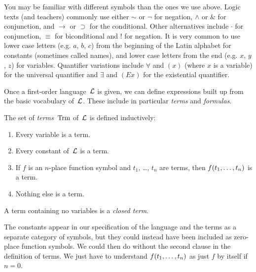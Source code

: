 \documentclass[open-logic-section]{subfiles}
\begin{document}

\begin{intro}
You may be familiar with different symbols than the ones we use
above. Logic texts (and teachers) commonly use either $\sim$ or $\neg$
for negation, $\wedge$ or $\&$ for conjunction, and $\rightarrow$ or
$\supset$ for the conditional. Other alternatives include $\cdot$ for
conjunction, $\equiv$ for biconditional and ! for negation. It is very
common to use lower case letters (e.g. $a$, $b$, $c$) from the
beginning of the Latin alphabet for constants (sometimes called
names), and lower case letters from the end (e.g. $x$, $y$, $z$)
for variables. Quantifier variations include $\forall$ and $(x)$
(where $x$ is a variable) for the universal quantifier and
$\exists$ and $(Ex)$ for the existential quantifier.
\end{intro}


\begin{wordy}
Once a first-order language~$\mathcal L$ is given, we can define
expressions built up from the basic vocabulary of~$\mathcal L$.  These
include in particular \emph{terms} and \emph{formulas}.
\end{wordy}

\begin{defn}[Term]
The set of \emph{terms}~$\Trm$ of~$\mathcal L$ is
defined inductively:
\begin{enumerate}
\item Every variable is a term.
\item Every constant of~$\mathcal L$ is a term.
\item If $f$ is an $n$-place function symbol and $t_1$, \dots, $t_n$
  are terms, then ${ f(t_1, \ldots, t_n) }$ is a term.
\item Nothing else is a term.
\end{enumerate}
A term containing no variables is a \emph{closed term}.
\end{defn}

\begin{wordy}
The constants appear in our specification of the language and the
terms as a separate category of symbols, but they could instead have
been included as zero-place function symbols.  We could then do
without the second clause in the definition of terms. We just have to
understand ${ f(t_1, \ldots, t_n) }$ as just $f$ by itself if $n =
0$.
\end{wordy}
\end{document}
